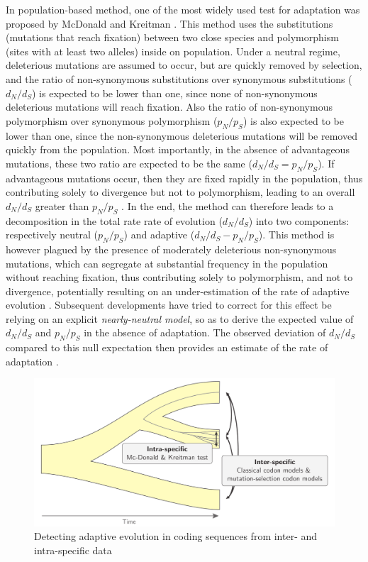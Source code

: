 In population-based method, one of the most widely used test for adaptation was proposed by McDonald and Kreitman \citet{McDonald1991}. This method uses the substitutions (mutations that reach fixation) between two close species and polymorphism (sites with at least two alleles) inside on population. Under a neutral regime, deleterious mutations are assumed to occur, but are quickly removed by selection, and the ratio of non-synonymous substitutions over synonymous substitutions ($d_N/d_S$) is expected to be lower than one, since none of non-synonymous deleterious mutations will reach fixation. Also the ratio of non-synonymous polymorphism over synonymous polymorphism ($p_N/p_S$) is also expected to be lower than one, since the non-synonymous deleterious mutations will be removed quickly from the population. Most importantly, in the absence of advantageous mutations, these two ratio are expected to be the same ($d_N/d_S=p_N/p_S$). If advantageous mutations occur, then they are fixed rapidly in the population, thus contributing solely to divergence but not to polymorphism, leading to an overall $d_N/d_S$ greater than $p_N/p_S$ \citet{smith_adaptive_2002, kimura_neutral_1983}. In the end, the method can therefore leads to a decomposition in the total rate rate of evolution ($d_N/d_S$) into two components: respectively neutral ($p_N/p_S$) and adaptive ($d_N/d_S-p_N/p_S$). This method is however plagued by the presence of moderately deleterious non-synonymous mutations, which can segregate at substantial frequency in the population without reaching fixation, thus contributing solely to polymorphism, and not to divergence, potentially resulting on an under-estimation of the rate of adaptive evolution \citet{eyre-walker_quantifying_2002}. Subsequent developments have tried to correct for this effect be relying on an explicit \textit{nearly-neutral model}, so as to derive the expected value of $d_N/d_S$ and $p_N/p_S$ in the absence of adaptation. The observed deviation of $d_N/d_S$ compared to this null expectation then provides an estimate of the rate of adaptation \citet{eyre-walker_estimating_2009, galtier_adaptive_2016}.

\begin{figure}[thbp]
	\begin{center}
		\includegraphics[width=\textwidth] {figures/inter-intra}
	\end{center}
	\caption{Detecting adaptive evolution in coding sequences from inter- and intra-specific data}
\end{figure}

